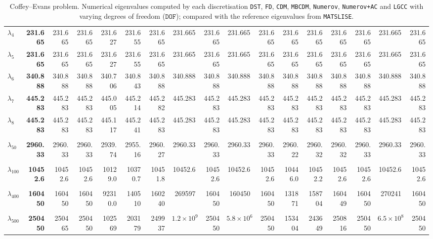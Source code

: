 \begin{table}[htbp]
{{\begin{tabular}{lrrrrrrrrrrrrrrrr}
      $\lambda_{4}$ & \textbf{231.665} & 231.665 & 231.665 & 231.627 & 231.655 & 231.665 & 231.665 & 231.665 & 231.665 & 231.665 & 231.665 & 231.665 & 231.665 & 231.665 & 231.665 & 231.665 \\
      $\lambda_{5}$ & \textbf{231.665} & 231.665 & 231.665 & 231.627 & 231.655 & 231.665 & 231.665 & 231.665 & 231.665 & 231.665 & 231.665 & 231.665 & 231.665 & 231.665 & 231.665 & 231.665 \\
      $\lambda_{6}$ & \textbf{340.888} & 340.888 & 340.888 & 340.706 & 340.843 & 340.888 & 340.888 & 340.888 & 340.888 & 340.888 & 340.888 & 340.888 & 340.888 & 340.888 & 340.888 & 340.888 \\
      $\lambda_{7}$ & \textbf{445.283} & 445.283 & 445.283 & 445.005 & 445.214 & 445.282 & 445.283 & 445.283 & 445.283 & 445.283 & 445.283 & 445.283 & 445.283 & 445.283 & 445.283 & 445.283 \\
      $\lambda_{8}$ & \textbf{445.283} & 445.283 & 445.283 & 445.117 & 445.241 & 445.283 & 445.283 & 445.283 & 445.283 & 445.283 & 445.283 & 445.283 & 445.283 & 445.283 & 445.283 & 445.283 \\
      & & & & & & & & & & & & & & & & \\
      $\lambda_{50}$ & \textbf{2960.33} & 2960.33 & 2960.33 & 2939.74 & 2955.16 & 2960.27 & 2960.33 & 2960.33 & 2960.33 & 2960.33 & 2960.22 & 2960.32 & 2960.32 & 2960.33 & 2960.33 & 2960.33 \\
      & & & & & & & & & & & & & & & & \\
      $\lambda_{100}$ & \textbf{10452.6} & 10452.6 & 10452.6 & 10129.0 & 10370.7 & 10451.8 & 10452.6 & 10452.6 & 10452.6 & 10452.6 & 10446.0 & 10452.2 & 10452.6 & 10452.6 & 10452.6 & 10452.6 \\
      & & & & & & & & & & & & & & & & \\
      $\lambda_{400}$ & \textbf{160450} & 160450 & 160450 & 92310.0 & 140510 & 160240 & 269597 & 160450 & 160450 & 160450 & 131871 & 158704 & 160449 & 160450 & 270241 & 160450 \\
      & & & & & & & & & & & & & & & & \\
      $\lambda_{500}$ & \textbf{250450} & 250465 & 250450 & 102569 & 203179 & 249937 & $1.2 \times 10^{9}$ & 250450 & $5.8 \times 10^{6}$ & 250450 & 153404 & 243649 & 250816 & 250450 & $6.5 \times 10^{8}$ & 250450 \\
      \bottomrule
    \end{tabular}}}
  \caption{Coffey--Evans problem. Numerical eigenvalues computed by each discretisation \texttt{DST}, \texttt{FD}, \texttt{CDM}, \texttt{MBCDM}, \texttt{Numerov}, \texttt{Numerov+AC} and \texttt{LGCC} with varying degrees of freedom ($\mathtt{DOF}$); compared with the reference eigenvalues from \texttt{MATSLISE}.}
  \label{tab:eigenvalues_head_coffey_evans_transposed_one_table}
\end{table}
